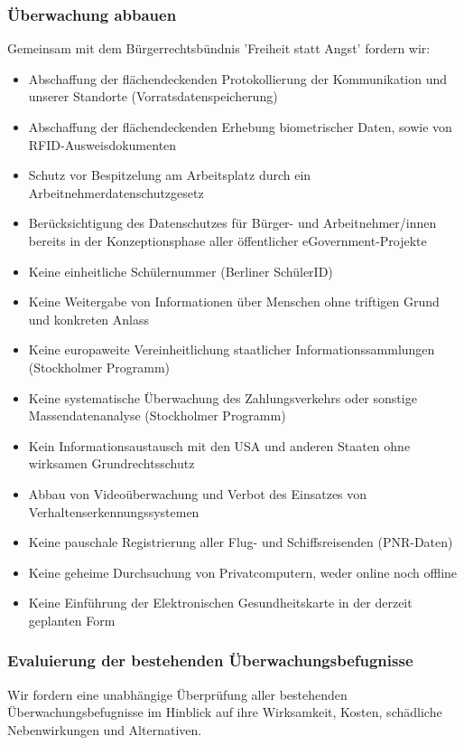 \subsubsection{Überwachung abbauen}
\abstimmung
Gemeinsam mit dem Bürgerrechtsbündnis 'Freiheit statt Angst' fordern wir:
\begin{itemize}
\item Abschaffung der flächendeckenden Protokollierung der Kommunikation und unserer Standorte (Vorratsdatenspeicherung)
\item Abschaffung der flächendeckenden Erhebung biometrischer Daten, sowie von RFID-Ausweisdokumenten
\item Schutz vor Bespitzelung am Arbeitsplatz durch ein Arbeitnehmerdatenschutzgesetz
\item Berücksichtigung des Datenschutzes für Bürger- und Arbeitnehmer/innen bereits in der Konzeptionsphase aller öffentlicher eGovernment-Projekte
\item Keine einheitliche Schülernummer (Berliner SchülerID)
\item Keine Weitergabe von Informationen über Menschen ohne triftigen Grund und konkreten Anlass
\item Keine europaweite Vereinheitlichung staatlicher Informationssammlungen (Stockholmer Programm)
\item Keine systematische Überwachung des Zahlungsverkehrs oder sonstige Massendatenanalyse (Stockholmer Programm)
\item Kein Informationsaustausch mit den USA und anderen Staaten ohne wirksamen Grundrechtsschutz
\item Abbau von Videoüberwachung und Verbot des Einsatzes von Verhaltenserkennungssystemen
\item Keine pauschale Registrierung aller Flug- und Schiffsreisenden (PNR-Daten)
\item Keine geheime Durchsuchung von Privatcomputern, weder online noch offline
\item Keine Einführung der Elektronischen Gesundheitskarte in der derzeit geplanten Form
\end{itemize}

\subsubsection{Evaluierung der bestehenden Überwachungsbefugnisse}
\abstimmung
Wir fordern eine unabhängige Überprüfung aller bestehenden Überwachungsbefugnisse im Hinblick auf ihre Wirksamkeit, Kosten, schädliche Nebenwirkungen und Alternativen.

